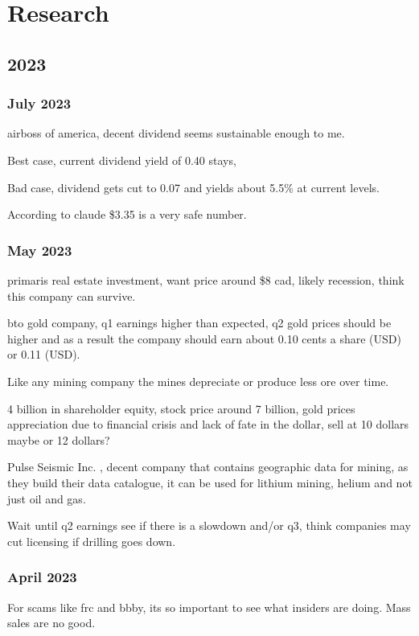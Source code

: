 \chapter{Research}


\section{2023}

\subsection{July 2023}

airboss of america, decent dividend seems sustainable enough to me. 

Best case, current dividend yield of 0.40 stays,

Bad case, dividend gets cut to 0.07 and yields about 5.5\% at current levels.

According to claude \$3.35 is a very safe number.

\subsection{May 2023}

primaris real estate investment, want price around \$8 cad, likely recession, think this company can survive.

bto gold company, q1 earnings higher than expected, q2 gold prices should be higher and as a result the company should earn about 0.10 cents a share (USD) or 0.11 (USD).

Like any mining company the mines depreciate or produce less ore over time.

4 billion in shareholder equity, stock price around 7 billion, gold prices appreciation due to financial crisis and lack of fate in the dollar, sell at 10 dollars maybe or 12 dollars?

Pulse Seismic Inc. , decent company that contains geographic data for mining, as they build their data catalogue, it can be used for lithium mining, helium and not just oil and gas.

Wait until q2 earnings see if there is a slowdown and/or q3, think companies may cut licensing if drilling goes down.
\subsection{April 2023}

For scams like frc and bbby, its so important to see what insiders are doing. Mass sales are no good.


